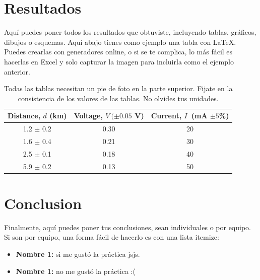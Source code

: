 \section{Resultados}

Aquí puedes poner todos los resultados que obtuviste, incluyendo tablas, gráficos, dibujos o esquemas. Aquí abajo tienes como ejemplo una tabla con LaTeX. Puedes crearlas con generadores online, o si se te complica, lo más fácil es hacerlas en Excel y solo capturar la imagen para incluirla como el ejemplo anterior. 

\begin{table}[ht]
\begin{center}
\caption{Todas las tablas necesitan un pie de foto en la parte superior. Fijate en la consistencia de los valores de las tablas. No olvides tus unidades.}
\label{table1} 
\begin{tabular}{ccc} %
\hline
\multicolumn{1}{c}{Distance, $d$ (km) } & \multicolumn{1}{c}{Voltage, $V\ (\pm 0.05$ V)} & \multicolumn{1}{c}{Current, $I$\ (mA $\pm 5$\%)}\\
\hline
1.2 $\pm$ 0.2 &  0.30 & 20 \\
1.6 $\pm$ 0.4 &  0.21 & 30 \\
2.5 $\pm$ 0.1 &  0.18 & 40 \\
5.9 $\pm$ 0.2 &  0.13 & 50 \\
\hline
\end{tabular}
\end{center}
\end{table}


\section{Conclusion}
Finalmente, aquí puedes poner tus conclusiones, sean individuales o por equipo. Si son por equipo, una forma fácil de hacerlo es con una lista itemize:

\begin{itemize}
  \item \textbf{Nombre 1:} si me gustó la práctica jsjs.

  \item \textbf{Nombre 1:} no me gustó la práctica :(

\end{itemize}
